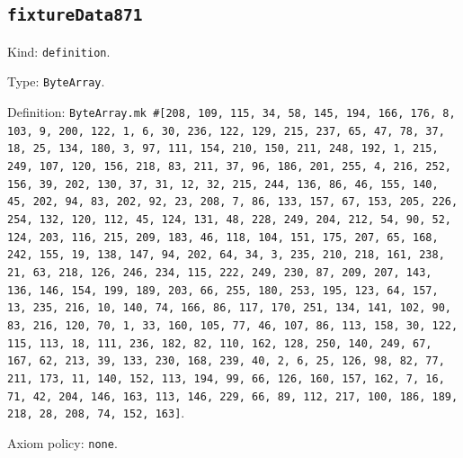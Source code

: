 \documentclass[11pt]{article}
\begin{document}
\subsection*{\texttt{fixtureData871}}
\noindent Kind: \texttt{definition}.\par
\noindent Type: \texttt{ByteArray}.\par
\noindent Definition: \texttt{ByteArray.mk \#[208, 109, 115, 34, 58, 145, 194, 166, 176, 8, 103, 9, 200, 122, 1, 6, 30, 236, 122, 129, 215, 237, 65, 47, 78, 37, 18, 25, 134, 180, 3, 97, 111, 154, 210, 150, 211, 248, 192, 1, 215, 249, 107, 120, 156, 218, 83, 211, 37, 96, 186, 201, 255, 4, 216, 252, 156, 39, 202, 130, 37, 31, 12, 32, 215, 244, 136, 86, 46, 155, 140, 45, 202, 94, 83, 202, 92, 23, 208, 7, 86, 133, 157, 67, 153, 205, 226, 254, 132, 120, 112, 45, 124, 131, 48, 228, 249, 204, 212, 54, 90, 52, 124, 203, 116, 215, 209, 183, 46, 118, 104, 151, 175, 207, 65, 168, 242, 155, 19, 138, 147, 94, 202, 64, 34, 3, 235, 210, 218, 161, 238, 21, 63, 218, 126, 246, 234, 115, 222, 249, 230, 87, 209, 207, 143, 136, 146, 154, 199, 189, 203, 66, 255, 180, 253, 195, 123, 64, 157, 13, 235, 216, 10, 140, 74, 166, 86, 117, 170, 251, 134, 141, 102, 90, 83, 216, 120, 70, 1, 33, 160, 105, 77, 46, 107, 86, 113, 158, 30, 122, 115, 113, 18, 111, 236, 182, 82, 110, 162, 128, 250, 140, 249, 67, 167, 62, 213, 39, 133, 230, 168, 239, 40, 2, 6, 25, 126, 98, 82, 77, 211, 173, 11, 140, 152, 113, 194, 99, 66, 126, 160, 157, 162, 7, 16, 71, 42, 204, 146, 163, 113, 146, 229, 66, 89, 112, 217, 100, 186, 189, 218, 28, 208, 74, 152, 163]}.\par
\noindent Axiom policy: \texttt{none}.\par
\end{document}
